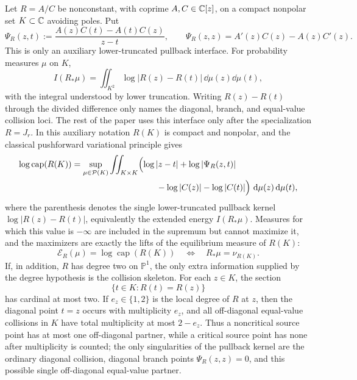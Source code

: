 \begin{theorem}\label{thm:degree-two-rational-image-capacity}
Let \(R=A/C\) be nonconstant, with coprime \(A,C\in\mathbb{C}[z]\), on a compact nonpolar set \(K\subset\mathbb{C}\) avoiding poles.  Put
\[
\Psi_R(z,t):=\frac{A(z)C(t)-A(t)C(z)}{z-t},
\qquad
\Psi_R(z,z)=A'(z)C(z)-A(z)C'(z).
\]
This is only an auxiliary lower-truncated pullback interface.  For
probability measures \(\mu\) on \(K\),
\[
I(R_\ast\mu)=
\iint_{K^2}\log|R(z)-R(t)|\,\dd\mu(z)\dd\mu(t),
\]
with the integral understood by lower truncation.  Writing
\(R(z)-R(t)\) through the divided difference only names the diagonal,
branch, and equal-value collision loci.  The rest of the paper uses
this interface only after the specialization \(R=J_r\).
In this auxiliary notation \(R(K)\) is compact and nonpolar, and the
classical pushforward variational principle gives
\[
\begin{aligned}
\log\operatorname{cap}(R(K))
&=
\sup_{\mu\in\mathcal P(K)}\iint_{K\times K}
\Bigl(\log|z-t|+\log|\Psi_R(z,t)| \\
&\hspace{3.5cm}{}-
\log|C(z)|-\log|C(t)|\Bigr)
\,\dd\mu(z)\dd\mu(t),
\end{aligned}
\]
where the parenthesis denotes the single lower-truncated pullback kernel \(\log|R(z)-R(t)|\), equivalently the extended energy \(I(R_\ast\mu)\).  Measures for which this value is \(-\infty\) are included in the supremum but cannot maximize it, and the maximizers are exactly the lifts of the equilibrium measure of \(R(K)\):
\[
\mathcal E_R(\mu)=\log\operatorname{cap}(R(K))
\quad\Longleftrightarrow\quad
R_\ast\mu=\nu_{R(K)}.
\]
If, in addition, \(R\) has degree two on \(\mathbb P^1\), the only
extra information supplied by the degree hypothesis is the collision
skeleton.  For each \(z\in K\), the section
\[
\{t\in K:R(t)=R(z)\}
\]
has cardinal at most two.  If \(e_z\in\{1,2\}\) is the local degree of \(R\) at \(z\), then the diagonal point \(t=z\) occurs with multiplicity \(e_z\), and all off-diagonal equal-value collisions in \(K\) have total multiplicity at most \(2-e_z\).  Thus a noncritical source point has at most one off-diagonal partner, while a critical source point has none after multiplicity is counted; the only singularities of the pullback kernel are the ordinary diagonal collision, diagonal branch points \(\Psi_R(z,z)=0\), and this possible single off-diagonal equal-value partner.
\end{theorem}

